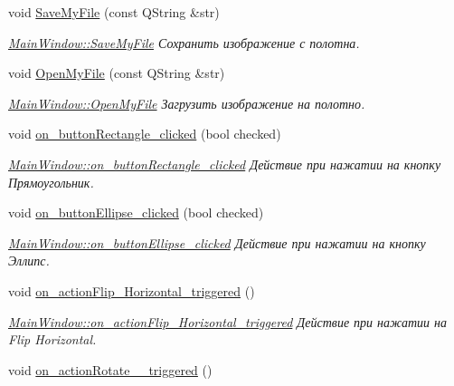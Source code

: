 \begin{DoxyCompactItemize}
void \hyperlink{class_main_window_ad847255358c94e17c5c128e3054ee59f}{Save\+My\+File} (const Q\+String \&str)
\begin{DoxyCompactList}\small\item\em \hyperlink{class_main_window_ad847255358c94e17c5c128e3054ee59f}{Main\+Window\+::\+Save\+My\+File} Сохранить изображение с полотна. \end{DoxyCompactList}\item 
void \hyperlink{class_main_window_af7a4a93fe3b09dad4f0d5512367b1ab6}{Open\+My\+File} (const Q\+String \&str)
\begin{DoxyCompactList}\small\item\em \hyperlink{class_main_window_af7a4a93fe3b09dad4f0d5512367b1ab6}{Main\+Window\+::\+Open\+My\+File} Загрузить изображение на полотно. \end{DoxyCompactList}\item 
void \hyperlink{class_main_window_ad8b548a052731d90a75f3d5890eb2509}{on\+\_\+button\+Rectangle\+\_\+clicked} (bool checked)
\begin{DoxyCompactList}\small\item\em \hyperlink{class_main_window_ad8b548a052731d90a75f3d5890eb2509}{Main\+Window\+::on\+\_\+button\+Rectangle\+\_\+clicked} Действие при нажатии на кнопку Прямоугольник. \end{DoxyCompactList}\item 
void \hyperlink{class_main_window_a41b4343982dab5ba73d9a78d0b1744ea}{on\+\_\+button\+Ellipse\+\_\+clicked} (bool checked)
\begin{DoxyCompactList}\small\item\em \hyperlink{class_main_window_a41b4343982dab5ba73d9a78d0b1744ea}{Main\+Window\+::on\+\_\+button\+Ellipse\+\_\+clicked} Действие при нажатии на кнопку Эллипс. \end{DoxyCompactList}\item 
void \hyperlink{class_main_window_a41953d7e1666db10a02b5bc5cea428b7}{on\+\_\+action\+Flip\+\_\+\+Horizontal\+\_\+triggered} ()
\begin{DoxyCompactList}\small\item\em \hyperlink{class_main_window_a41953d7e1666db10a02b5bc5cea428b7}{Main\+Window\+::on\+\_\+action\+Flip\+\_\+\+Horizontal\+\_\+triggered} Действие при нажатии на Flip Horizontal. \end{DoxyCompactList}\item 
void \hyperlink{class_main_window_af22425cb6431dde120a5600dc8fc12cd}{on\+\_\+action\+Rotate\+\_\+\_\+triggered} ()

\end{DoxyCompactItemize}
